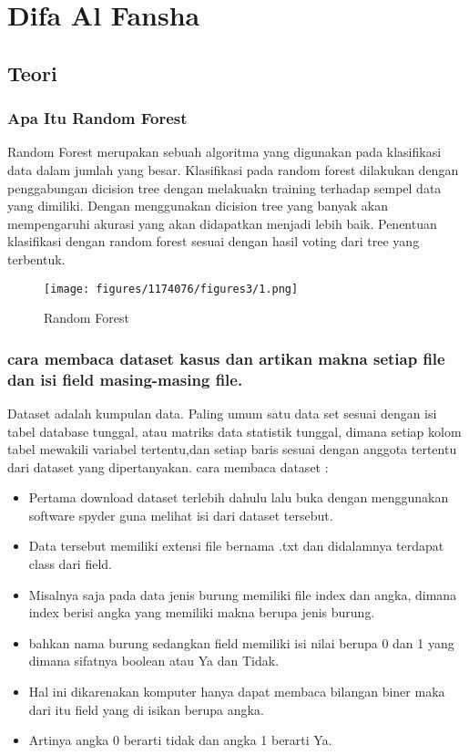 \section{Difa Al Fansha}
\subsection{Teori}

\subsubsection{Apa Itu Random Forest}

\hfill\break
Random Forest merupakan sebuah algoritma yang digunakan pada klasifikasi data dalam jumlah yang besar. Klasifikasi pada random forest dilakukan dengan penggabungan dicision tree dengan melakuakn training terhadap sempel data yang dimiliki. Dengan menggunakan dicision tree yang banyak akan mempengaruhi akurasi yang akan didapatkan menjadi lebih baik. Penentuan klasifikasi dengan random forest sesuai dengan hasil voting dari tree yang terbentuk.
\begin{figure}[H]
\centerline{\texttt{[image: figures/1174076/figures3/1.png]}}
\caption{Random Forest}
\label{labelgambar}
\end{figure}

\subsubsection{cara membaca dataset kasus dan artikan makna setiap file dan isi field masing-masing file.}

\hfill\break
Dataset adalah kumpulan data. Paling umum satu data set sesuai dengan isi tabel database tunggal, atau matriks data statistik tunggal, dimana setiap kolom tabel mewakili variabel tertentu,dan setiap baris sesuai dengan anggota tertentu dari dataset yang dipertanyakan. cara membaca dataset :
\begin{itemize}
\item Pertama download dataset terlebih dahulu lalu buka dengan menggunakan software spyder guna melihat isi dari dataset tersebut.

\item Data tersebut memiliki extensi file bernama .txt dan didalamnya terdapat class dari field.

\item Misalnya saja pada data jenis burung memiliki file index dan angka, dimana index berisi angka yang memiliki makna berupa jenis burung.

\item bahkan nama burung sedangkan field memiliki isi nilai berupa 0 dan 1 yang dimana sifatnya boolean atau Ya dan Tidak.

\item Hal ini dikarenakan komputer hanya dapat membaca bilangan biner maka dari itu field yang di isikan berupa angka.

\item Artinya angka 0 berarti tidak dan angka 1 berarti Ya.
\end{itemize}

